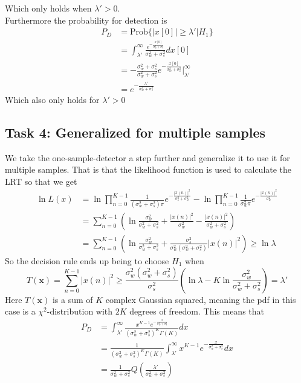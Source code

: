 Which only holds when $\lambda'>0$.\\
Furthermore the probability for detection is
\begin{align}
    P_D & = \text{Prob}\{|x[0]|\geq\lambda'\big\vert H_1\}\nonumber\\
    & = \int_{\lambda'}^{\infty}\frac{e^{-\frac{x[0]}{\sigma_w^2+\sigma_s^2}}}{\sigma_w^2+\sigma_s^2}dx[0]\nonumber\\
    & = -\frac{\sigma_w^2+\sigma_s^2}{\sigma_w^2+\sigma_s^2}e^{-\frac{x[0]}{\sigma_w^2+\sigma_s^2}}\bigg\rvert_{\lambda'}^{\infty}\nonumber\\
    & = e^{-\frac{\lambda'}{\sigma_w^2+\sigma_s^2}}\nonumber
\end{align}
Which also only holds for $\lambda'>0$\\

\subsection{Task 4: Generalized for multiple samples}
We take the one-sample-detector a step further and generalize it to use it for multiple samples. That is that the likelihood function is used to calculate the LRT so that we get
\begin{align}
    \ln L(x) & = \ln\prod_{n=0}^{K-1}\frac{1}{(\sigma_w^2+\sigma_s^2)\pi}e^{-\frac{|x(n)|^2}{\sigma_s^2+\sigma_w^2}}-\ln\prod_{n=0}^{K-1}\frac{1}{\sigma_w^2\pi}e^{-\frac{|x(n)|^2}{\sigma_w^2}}\nonumber\\
    & = \sum_{n=0}^{K-1}\left(\ln\frac{\sigma_w^2}{\sigma_w^2+\sigma_s^2} + \frac{|x(n)|^2}{\sigma_w^2}-\frac{|x(n)|^2}{\sigma_w^2+\sigma_s^2} \right)\nonumber\\
    & = \sum_{n=0}^{K-1}\left(\ln\frac{\sigma_w^2}{\sigma_w^2+\sigma_s^2} + \frac{\sigma_s^2}{\sigma_w^2(\sigma_w^2+\sigma_s^2)}|x(n)|^2\right)\geq\ln\lambda\nonumber
\end{align}
So the decision rule ends up being to choose $H_1$ when
\begin{equation}
    T(\mathbf{x}) = \sum_{n=0}^{K-1}|x(n)|^2 \geq \frac{\sigma_w^2(\sigma_w^2+\sigma_s^2)}{\sigma_s^2}\left(\ln\lambda-K\ln\frac{\sigma_w^2}{\sigma_w^2+\sigma_s^2}\right) = \lambda'
\end{equation}
Here $T(\mathbf{x})$ is a sum of $K$ complex Gaussian squared, meaning the pdf in this case is a $\chi^2$-distribution with $2K$ degrees of freedom. This means that
\begin{align}
    P_D & = \int_{\lambda'}^{\infty}\frac{x^{K-1}e^{-\frac{x}{\sigma_w^2+\sigma_s^2}}}{(\sigma_w^2+\sigma_s^2)^K\Gamma(K)}dx\nonumber\\
    & = \frac{1}{(\sigma_w^2+\sigma_s^2)^K\Gamma(K)}\int_{\lambda'}^{\infty}x^{K-1}e^{-\frac{x}{\sigma_w^2+\sigma_s^2}}dx\nonumber\\
    & = \frac{1}{\sigma_w^2+\sigma_s^2}Q\left(\frac{\lambda'}{\sigma_w^2+\sigma_s^2}\right)
\end{align}
